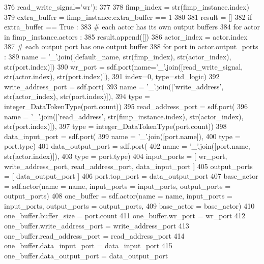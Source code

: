 \begin{DoxyCode}
376   read\_write\_signal=\textcolor{stringliteral}{'wr'}):
377 
378   fimp\_index = str(fimp\_instance.index)
379   extra\_buffer = fimp\_instance.extra\_buffer == 1
380 
381   result = []
382   \textcolor{keywordflow}{if} extra\_buffer == \textcolor{keyword}{True} :
383     \textcolor{comment}{# each actor has its own output buffers}
384     \textcolor{keywordflow}{for} actor \textcolor{keywordflow}{in} fimp\_instance.actors :
385       result.append([])
386       actor\_index = actor.index
387       \textcolor{comment}{# each output port has one output buffer}
388       \textcolor{keywordflow}{for} port \textcolor{keywordflow}{in} actor.output\_ports :
389         name = \textcolor{stringliteral}{'\_'}.join([default\_name, str(fimp\_index), str(actor\_index), str(port.index)])
390         wr\_port = sdf.port(name=\textcolor{stringliteral}{'\_'}.join([read\_write\_signal, str(actor.index), str(port.index)]),
391           index=0, type=std\_logic)
392         write\_address\_port = sdf.port(
393           name = \textcolor{stringliteral}{'\_'}.join([\textcolor{stringliteral}{'write\_address'}, str(actor\_index), str(port.index)]),
394           type = integer\_DataTokenType(port.count))
395         read\_address\_port = sdf.port(
396           name = \textcolor{stringliteral}{'\_'}.join([\textcolor{stringliteral}{'read\_address'}, str(fimp\_instance.index), str(actor\_index), str(port.index)]),
397           type = integer\_DataTokenType(port.count))
398         data\_input\_port = sdf.port(
399           name = \textcolor{stringliteral}{'\_'}.join([port.name]),
400           type = port.type)
401         data\_output\_port = sdf.port(
402           name = \textcolor{stringliteral}{'\_'}.join([port.name, str(actor.index)]),
403           type = port.type)
404         input\_ports = [ wr\_port, write\_address\_port, read\_address\_port, data\_input\_port ]
405         output\_ports = [ data\_output\_port ]
406         port.top\_port = data\_output\_port
407         base\_actor = sdf.actor(name = name, input\_ports = input\_ports, output\_ports = output\_ports)
408         one\_buffer = sdf.actor(name = name, input\_ports = input\_ports, output\_ports = output\_ports,
409           base\_actor = base\_actor)
410         one\_buffer.buffer\_size = port.count
411         one\_buffer.wr\_port = wr\_port
412         one\_buffer.write\_address\_port = write\_address\_port
413         one\_buffer.read\_address\_port = read\_address\_port
414         one\_buffer.data\_input\_port = data\_input\_port
415         one\_buffer.data\_output\_port = data\_output\_port

\end{DoxyCode}
